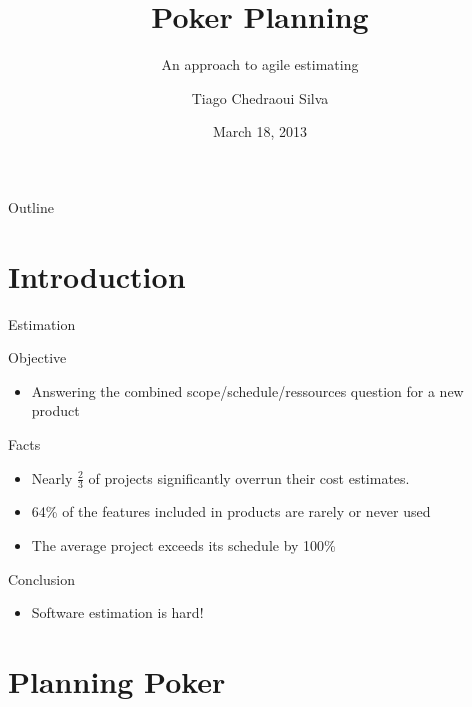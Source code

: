 \documentclass[dvips,11pt,xcolor=dvipsnames]{beamer}
\title{Poker Planning}
\subtitle{An approach to agile estimating}
\author[Tiago C. Siva]{
  Tiago Chedraoui Silva \\
}
\institute{Télécom Paristech}
\date{March 18, 2013}
\numberwithin{table}{section}
\numberwithin{figure}{section} %
\begin{document}
\begin{frame}
  \titlepage
\end{frame}

\begin{frame}{Outline}
  \tableofcontents
\end{frame}


\section{Introduction}

\begin{frame}{Estimation}

  \begin{block}{Objective}
    \begin{itemize}
      
    \item Answering the combined scope/schedule/ressources question for a new product

    \end{itemize}
  \end{block}
  
  \begin{block}{Facts}
    \begin{itemize}
      
    \item Nearly {\color{orange}$\frac{2}{3}$} of projects significantly overrun their cost estimates.
    \item  {\color{orange}64\%} of the features included in products are rarely or never used
    \item The average project exceeds its schedule by  {\color{orange}100\%}
      
    \end{itemize}
  \end{block}
  
  \pause \begin{alertblock}{Conclusion}
    \begin{itemize}
      
    \item Software estimation is hard!
      
    \end{itemize}
  \end{alertblock}

\end{frame}

\section{Planning Poker}
\end{document}

